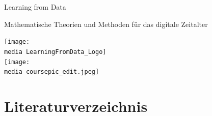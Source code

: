 \documentclass{newlayout}
\newcommand{\media}{media/}
\begin{document}
%
\setcounter{page}{3}

\setcounter{tocdepth}{1}
\tableofcontents

\setcounter{secnumdepth}{1}

\setcounter{page}{7}
\setcounter{chapter}{0}


\begin{coursetitle}
  \centerline{Learning from Data} 
  \bigskip
  \Large \centerline{Mathematische Theorien und Methoden für das digitale Zeitalter}
  \bigskip
 \texttt{[image: \\media LearningFromData\_Logo]}\\
  \bigskip
  \texttt{[image: \\media coursepic\_edit.jpeg]}
\end{coursetitle}









%















\section*{Literaturverzeichnis}
\end{document}
